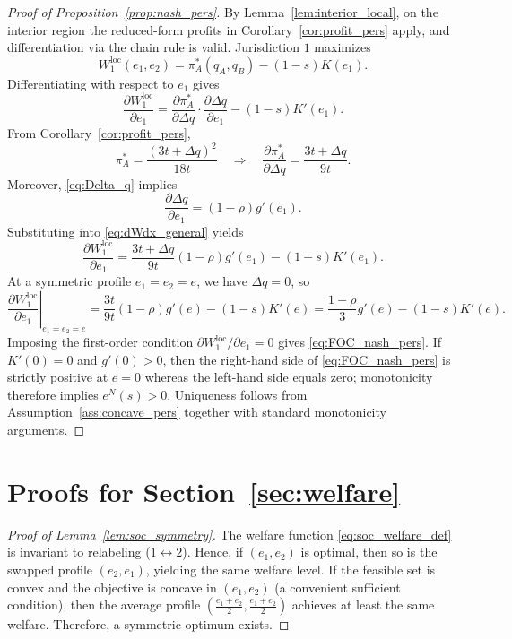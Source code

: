 \begin{proof}[Proof of Proposition~\ref{prop:nash_pers}]
\label{app:proof-nash}
By Lemma~\ref{lem:interior_local}, on the interior region the reduced-form profits in Corollary~\ref{cor:profit_pers} apply, and differentiation via the chain rule is valid. Jurisdiction $1$ maximizes
\[
W_1^{\mathrm{loc}}(e_1,e_2)=\pi_A^*(q_A,q_B)-(1-s)K(e_1).
\]
Differentiating with respect to $e_1$ gives
\begin{equation}\label{eq:dWdx_general}
\frac{\partial W_1^{\mathrm{loc}}}{\partial e_1}
=\frac{\partial \pi_A^*}{\partial \Delta q}\cdot\frac{\partial \Delta q}{\partial e_1}-(1-s)K'(e_1).
\end{equation}
From Corollary~\ref{cor:profit_pers},
\[
\pi_A^*=\frac{(3t+\Delta q)^2}{18t}
\quad\Rightarrow\quad
\frac{\partial \pi_A^*}{\partial \Delta q}=\frac{3t+\Delta q}{9t}.
\]
Moreover, \eqref{eq:Delta_q} implies
\[
\frac{\partial \Delta q}{\partial e_1}=(1-\rho)g'(e_1).
\]
Substituting into \eqref{eq:dWdx_general} yields
\[
\frac{\partial W_1^{\mathrm{loc}}}{\partial e_1}
=\frac{3t+\Delta q}{9t}(1-\rho)g'(e_1)-(1-s)K'(e_1).
\]
At a symmetric profile $e_1=e_2=e$, we have $\Delta q=0$, so
\[
\left.\frac{\partial W_1^{\mathrm{loc}}}{\partial e_1}\right|_{e_1=e_2=e}
=\frac{3t}{9t}(1-\rho)g'(e)-(1-s)K'(e)
=\frac{1-\rho}{3}g'(e)-(1-s)K'(e).
\]
Imposing the first-order condition $\partial W_1^{\mathrm{loc}}/\partial e_1=0$ gives \eqref{eq:FOC_nash_pers}. If $K'(0)=0$ and $g'(0)>0$, then the right-hand side of \eqref{eq:FOC_nash_pers} is strictly positive at $e=0$ whereas the left-hand side equals zero; monotonicity therefore implies $e^{N}(s)>0$. Uniqueness follows from Assumption~\ref{ass:concave_pers} together with standard monotonicity arguments.
\end{proof}

\section{Proofs for Section~\ref{sec:welfare}}
\label{app:welfare}

\begin{proof}[Proof of Lemma~\ref{lem:soc_symmetry}]
\label{app:proof-soc-sym}
The welfare function \eqref{eq:soc_welfare_def} is invariant to relabeling ($1\leftrightarrow 2$). Hence, if $(e_1,e_2)$ is optimal, then so is the swapped profile $(e_2,e_1)$, yielding the same welfare level. If the feasible set is convex and the objective is concave in $(e_1,e_2)$ (a convenient sufficient condition), then the average profile $(\frac{e_1+e_2}{2},\frac{e_1+e_2}{2})$ achieves at least the same welfare. Therefore, a symmetric optimum exists.
\end{proof}


